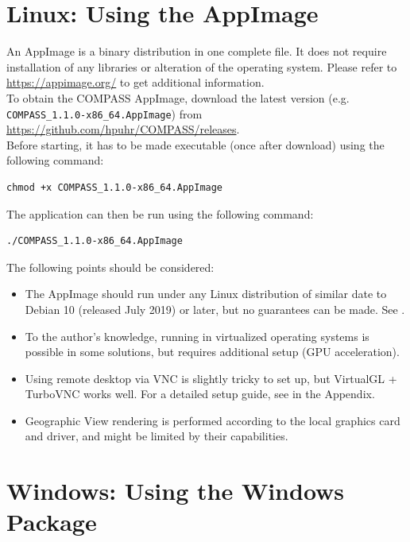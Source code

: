 \section{Linux: Using the AppImage}
\label{sec:install_appimage}

An AppImage is a binary distribution in one complete file. It does not require installation of any libraries or alteration of the operating system.
Please refer to \url{https://appimage.org/} to get additional information. \\

To obtain the COMPASS AppImage, download the latest version (e.g. \texttt{COMPASS\_1.1.0-x86\_64.AppImage}) from \url{https://github.com/hpuhr/COMPASS/releases}. \\

Before starting, it has to be made executable (once after download) using the following command:
\begin{lstlisting}
chmod +x COMPASS_1.1.0-x86_64.AppImage
\end{lstlisting}

The application can then be run using the following command:
\begin{lstlisting}
./COMPASS_1.1.0-x86_64.AppImage
\end{lstlisting}

The following points should be considered:

\begin{itemize}
\item The AppImage should run under any Linux distribution of similar date to Debian 10 (released July 2019) or later, but no guarantees can be made. See .
\item To the author's knowledge, running in virtualized operating systems is possible in some solutions, but requires additional setup (GPU acceleration).
\item Using remote desktop via VNC is slightly tricky to set up, but VirtualGL + TurboVNC works well. For a detailed setup guide, see  in the Appendix.
\item Geographic View rendering is performed according to the local graphics card and driver, and might be limited by their capabilities.
\end{itemize}

\section{Windows: Using the Windows Package}
\label{sec:install_windows}

